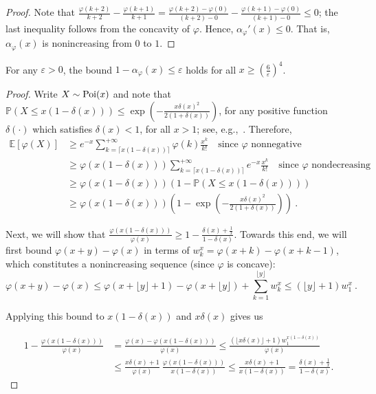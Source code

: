 \begin{proof}
Note that $\frac{\varphi(k+2)}{k+2} - \frac{\varphi(k+1)}{k+1} = \frac{\varphi(k+2) - \varphi(0)}{(k+2)-0} - \frac{\varphi(k+1) - \varphi(0)}{(k+1)-0}  \leq 0$; the last inequality follows from the concavity of $\varphi$. Hence, $\alpha_{\varphi}'(x) \leq 0$. That is, $\alpha_{\varphi}(x)$ is nonincreasing from $0$ to $1$.
\end{proof}

\begin{proposition}
For any $\varepsilon >0$,  the bound $1 - \alpha_{\varphi}(x) \leq \varepsilon$ holds for all $x \geq \left(\frac{6}{\varepsilon}\right)^4$.
\label{prop:ConvergenceRate}
\end{proposition}
\begin{proof}
Write $X \sim \operatorname{\text{Poi}}(x)$ and note that $\mathbb{P}(X \leq x(1-\delta(x))) \leq \exp(-\frac{x\delta(x)^2}{2(1+\delta(x))})$, for any positive function $\delta(\cdot)$ which satisfies $\delta(x) < 1$, for all $x >1$; see, e.g.,~\cite{PoissonBound}. Therefore, 
  \begin{equation}
    \begin{aligned}
      \mathbb{E}[\varphi(X)] &\geq  e^{-x}\sum_{k=\lceil x(1-\delta(x)) \rceil}^{+\infty}\varphi(k)\frac{x^k}{k!} \quad \text{since $\varphi$ nonnegative} \\
      &\geq   \varphi(x(1-\delta(x)))\sum_{k=\lceil x(1-\delta(x)) \rceil}^{+\infty}e^{-x}\frac{x^k}{k!}  \quad \text{since $\varphi$ nondecreasing} \\
      &\geq  \varphi(x(1-\delta(x)))(1-\mathbb{P}(X \leq x(1-\delta(x))))\\
      &\geq  \varphi(x(1-\delta(x)))\left(1-\exp(-\frac{x\delta(x)^2}{2(1+\delta(x))})\right)\ .  \label{ineq:exp-soup}
    \end{aligned}
  \end{equation}

Next, we will show that $\frac{\varphi(x(1-\delta(x)))}{\varphi(x)} \geq 1-\frac{\delta(x)+\frac{1}{x}}{1-\delta(x)}$. Towards this end, we will first bound $\varphi(x+y)-\varphi(x)$ in terms of $w^x_k = \varphi(x+k)-\varphi(x+k-1)$, which constitutes a nonincreasing sequence (since $\varphi$ is concave):
    \[ \varphi(x+y) - \varphi(x) \leq \varphi(x+\lfloor y \rfloor + 1)-\varphi(x+\lfloor y \rfloor) + \sum_{k=1}^{\lfloor y \rfloor} w^x_k \leq (\lfloor y \rfloor + 1) w^x_1 \ . \]

    Applying this bound to $x(1-\delta(x))$ and $x\delta(x)$ gives us
   
      \begin{align}
        1 - \frac{\varphi(x(1-\delta(x)))}{\varphi(x)} &=  \frac{\varphi(x)-\varphi(x(1-\delta(x)))}{\varphi(x)} \leq \frac{(\lfloor x\delta(x) \rfloor+1) w^{x(1-\delta(x))}_1}{\varphi(x)} \nonumber \\
        &\leq  \frac{x\delta(x)+1}{\varphi(x)} \ \frac{\varphi(x(1-\delta(x)))}{x(1-\delta(x))} \leq \frac{x\delta(x)+1}{x(1-\delta(x))} = \frac{\delta(x)+\frac{1}{x}}{1-\delta(x)}. \label{ineq:phi-soup}    \end{align}


\end{proof}
